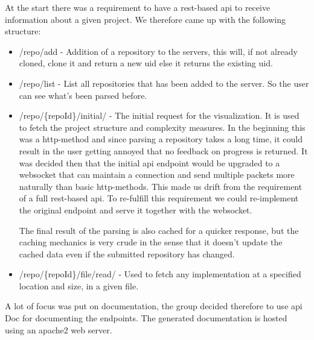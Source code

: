 At the start there was a requirement to have a \gls{rest}-based \gls{api} to receive information about a given project. We therefore came up with the following structure:
\begin{itemize}
    \item /repo/add - Addition of a repository to the servers, this will, if not already cloned, clone it and return a new \gls{uid} else it returns the existing \gls{uid}.
    \item /repo/list - List all repositories that has been added to the server. So the user can see what's been parsed before.
    \item /repo/\{repoId\}/initial/ - The initial request for the visualization. It is used to fetch the project structure and complexity measures. In the beginning this was a \gls{http}-method and since parsing a repository takes a long time, it could result in the user getting annoyed that no feedback on progress is returned. It was decided then that the initial \gls{api} endpoint would be upgraded to a \gls{websocket} that can maintain a connection and send multiple packets more naturally than basic \gls{http}-methods. This made us drift from the requirement of a full \gls{rest}-based \gls{api}. To re-fulfill this requirement we could re-implement the original endpoint and serve it together with the \gls{websocket}.  
    
    The final result of the parsing is also cached for a quicker response, but the caching mechanics is very crude in the sense that it doesn't update the cached data even if the submitted repository has changed.
    \item /repo/\{repoId\}/file/read/ - Used to fetch any implementation at a specified location and size, in a given file.
\end{itemize}

A lot of focus was put on documentation, the group decided therefore to use \gls{api} Doc for documenting the endpoints. The generated documentation is hosted using an \Gls{apache2} web server. 
